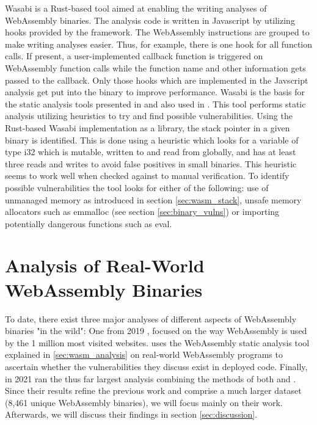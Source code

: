 \documentclass[sigconf]{acmart}
\begin{document}
{Wasabi \cite{lehmann_wasabi_2018} is a Rust-based tool aimed at enabling the writing analyses of WebAssembly binaries. The analysis code is written in Javascript by utilizing hooks provided by the framework. The WebAssembly instructions are grouped to make writing analyses easier. Thus, for example, there is one hook for all function calls. If present, a user-implemented callback function is triggered on WebAssembly function calls while the function name and other information gets passed to the callback. Only those hooks which are implemented in the Javscript analysis get put into the binary to improve performance. Wasabi is the basis for the static analysis tools presented in \cite{lehmann_everything_2020} and also used in \cite{hilbig_empirical_2021}. This tool performs static analysis utilizing heuristics to try and find possible vulnerabilities. Using the Rust-based Wasabi implementation as a library, the stack pointer in a given binary is identified. This is done using a heuristic which looks for a variable of type i32 which is mutable, written to and read from globally, and has at least three reads and writes to avoid false positives in small binaries. This heuristic seems to work well when checked against to manual verification. To identify possible vulnerabilities the tool looks for either of the following: use of unmanaged memory as introduced in section \ref{sec:wasm_stack}, unsafe memory allocators such as emmalloc (see section \ref{sec:binary_vulns}) or importing potentially dangerous functions such as eval.

\section{Analysis of Real-World WebAssembly Binaries}
\label{sec:real_world_wasm_analysis}
To date, there exist three major analyses of different aspects of WebAssembly binaries "in the wild": One from 2019 \cite{musch_new_2019}, focused on the way WebAssembly is used by the 1 million most visited websites. \cite{lehmann_everything_2020} uses the WebAssembly static analysis tool explained in \ref{sec:wasm_analysis} on real-world WebAssembly programs to ascertain whether the vulnerabilities they discuss exist in deployed code. Finally, in 2021 \cite{hilbig_empirical_2021} ran the thus far largest analysis combining the methods of both \cite{musch_new_2019} and \cite{lehmann_everything_2020}. Since their results refine the previous work and comprise a much larger dataset (8,461 unique WebAssembly binaries), we will focus mainly on their work. Afterwards, we will discuss their findings in section \ref{sec:discussion}. 

}
\end{document}
